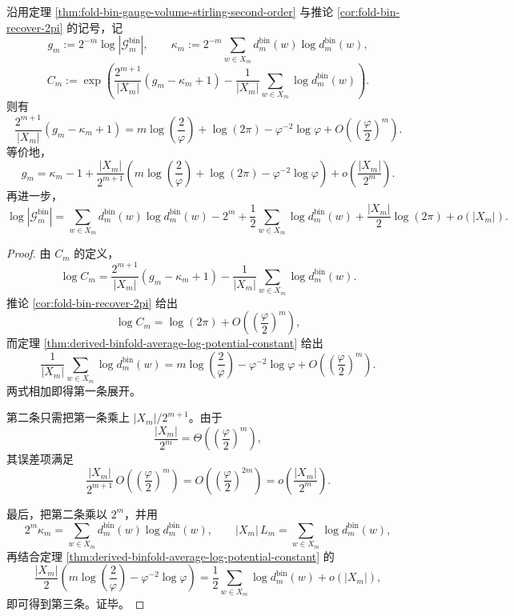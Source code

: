 \begin{theorem}\label{thm:derived-binfold-gauge-volume-second-asymptotic}
沿用定理 \ref{thm:fold-bin-gauge-volume-stirling-second-order} 与推论 \ref{cor:fold-bin-recover-2pi} 的记号，记
\[
g_m:=2^{-m}\log|\mathcal G_m^{\mathrm{bin}}|,
\qquad
\kappa_m:=2^{-m}\sum_{w\in X_m}d_m^{\mathrm{bin}}(w)\log d_m^{\mathrm{bin}}(w),
\]
\[
C_m:=
\exp\!\left(
\frac{2^{m+1}}{|X_m|}(g_m-\kappa_m+1)
-\frac{1}{|X_m|}\sum_{w\in X_m}\log d_m^{\mathrm{bin}}(w)
\right).
\]
则有
\[
\frac{2^{m+1}}{|X_m|}(g_m-\kappa_m+1)
=
m\log\!\left(\frac{2}{\varphi}\right)
+\log(2\pi)
-\varphi^{-2}\log\varphi
+O\!\left(\left(\frac{\varphi}{2}\right)^m\right).
\]
等价地，
\[
g_m
=
\kappa_m-1
+\frac{|X_m|}{2^{m+1}}
\left(
m\log\!\left(\frac{2}{\varphi}\right)
+\log(2\pi)
-\varphi^{-2}\log\varphi
\right)
+o\!\left(\frac{|X_m|}{2^m}\right).
\]
再进一步，
\[
\log|\mathcal G_m^{\mathrm{bin}}|
=
\sum_{w\in X_m}d_m^{\mathrm{bin}}(w)\log d_m^{\mathrm{bin}}(w)
-2^m
+\frac12\sum_{w\in X_m}\log d_m^{\mathrm{bin}}(w)
+\frac{|X_m|}{2}\log(2\pi)
+o(|X_m|).
\]
\end{theorem}
\begin{proof}
由 \(C_m\) 的定义，
\[
\log C_m
=
\frac{2^{m+1}}{|X_m|}(g_m-\kappa_m+1)
-\frac{1}{|X_m|}\sum_{w\in X_m}\log d_m^{\mathrm{bin}}(w).
\]
推论 \ref{cor:fold-bin-recover-2pi} 给出
\[
\log C_m=\log(2\pi)+O\!\left(\left(\frac{\varphi}{2}\right)^m\right),
\]
而定理 \ref{thm:derived-binfold-average-log-potential-constant} 给出
\[
\frac{1}{|X_m|}\sum_{w\in X_m}\log d_m^{\mathrm{bin}}(w)
=
m\log\!\left(\frac{2}{\varphi}\right)
-\varphi^{-2}\log\varphi
+O\!\left(\left(\frac{\varphi}{2}\right)^m\right).
\]
两式相加即得第一条展开。

第二条只需把第一条乘上 \(|X_m|/2^{m+1}\)。由于
\[
\frac{|X_m|}{2^m}
=
\Theta\!\left(\left(\frac{\varphi}{2}\right)^m\right),
\]
其误差项满足
\[
\frac{|X_m|}{2^{m+1}}\,O\!\left(\left(\frac{\varphi}{2}\right)^m\right)
=
O\!\left(\left(\frac{\varphi}{2}\right)^{2m}\right)
=
o\!\left(\frac{|X_m|}{2^m}\right).
\]

最后，把第二条乘以 \(2^m\)，并用
\[
2^m\kappa_m=\sum_{w\in X_m}d_m^{\mathrm{bin}}(w)\log d_m^{\mathrm{bin}}(w),
\qquad
|X_m|\,L_m=\sum_{w\in X_m}\log d_m^{\mathrm{bin}}(w),
\]
再结合定理 \ref{thm:derived-binfold-average-log-potential-constant} 的
\[
\frac{|X_m|}{2}
\left(
m\log\!\left(\frac{2}{\varphi}\right)-\varphi^{-2}\log\varphi
\right)
=
\frac12\sum_{w\in X_m}\log d_m^{\mathrm{bin}}(w)+o(|X_m|),
\]
即可得到第三条。证毕。
\end{proof}
